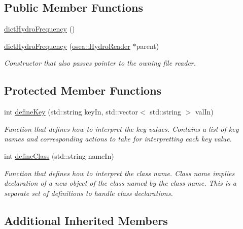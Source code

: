 \subsection*{Public Member Functions}
\begin{DoxyCompactItemize}
\item 
\hyperlink{classosea_1_1dict_hydro_frequency_a333ac5b1a37e7d93840b5551af0b6987}{dict\-Hydro\-Frequency} ()
\item 
\hyperlink{classosea_1_1dict_hydro_frequency_a12a0cb7639c7589011ef78782a268885}{dict\-Hydro\-Frequency} (\hyperlink{classosea_1_1_hydro_reader}{osea\-::\-Hydro\-Reader} $\ast$parent)
\begin{DoxyCompactList}\small\item\em Constructor that also passes pointer to the owning file reader. \end{DoxyCompactList}\end{DoxyCompactItemize}
\subsection*{Protected Member Functions}
\begin{DoxyCompactItemize}
\item 
int \hyperlink{classosea_1_1dict_hydro_frequency_a920a759ca7d6f576740e6c7de08e750d}{define\-Key} (std\-::string key\-In, std\-::vector$<$ std\-::string $>$ val\-In)
\begin{DoxyCompactList}\small\item\em Function that defines how to interpret the key values. Contains a list of key names and corresponding actions to take for interpretting each key value. \end{DoxyCompactList}\item 
int \hyperlink{classosea_1_1dict_hydro_frequency_a6c0cf6d39a09012b5806f620551e8885}{define\-Class} (std\-::string name\-In)
\begin{DoxyCompactList}\small\item\em Function that defines how to interpret the class name. Class name implies declaration of a new object of the class named by the class name. This is a separate set of definitions to handle class declarations. \end{DoxyCompactList}\end{DoxyCompactItemize}
\subsection*{Additional Inherited Members}


